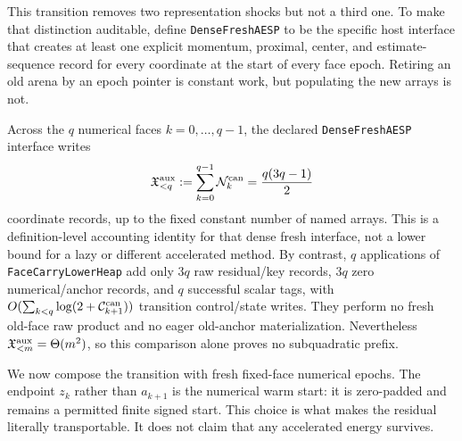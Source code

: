 This transition removes two representation shocks but not a third one.  To
make that distinction auditable, define \texttt{DenseFreshAESP} to be the
specific host interface that creates at least one explicit momentum,
proximal, center, and estimate-sequence record for every coordinate at the
start of every face epoch.  Retiring an old arena by an epoch pointer is
constant work, but populating the new arrays is not.

\begin{proposition}
\label{prop:branch-caterpillar-fresh-auxiliary-shock}
Across the $q$ numerical faces $k=0,\ldots,q-1$, the declared
\texttt{DenseFreshAESP} interface writes
\begin{equation}
 \mathfrak X_{<q}^{\rm aux}
 :=\sum_{k=0}^{q-1}\mathcal N_k^{\rm can}
 =\frac{q(3q-1)}2
 \label{eq:branch-caterpillar-fresh-auxiliary-shock}
\end{equation}
coordinate records, up to the fixed constant number of named arrays.  This
is a definition-level accounting identity for that dense fresh interface,
not a lower bound for a lazy or different accelerated method.  By contrast,
$q$ applications of \texttt{FaceCarryLowerHeap} add only $3q$ raw
residual/key records, $3q$ zero numerical/anchor records, and $q$ successful
scalar tags, with $O(\sum_{k<q}\log(2+\mathcal C_{k+1}^{\rm can}))$ transition
control/state writes.  They perform no fresh old-face raw product and no
eager old-anchor materialization.  Nevertheless
$\mathfrak X_{<m}^{\rm aux}=\Theta(m^2)$, so this comparison alone proves no
subquadratic prefix.
\end{proposition}

We now compose the transition with fresh fixed-face numerical epochs.  The
endpoint $z_k$ rather than $a_{k+1}$ is the numerical warm start: it is
zero-padded and remains a permitted finite signed start.  This choice is what
makes the residual literally transportable.  It does not claim that any
accelerated energy survives.

